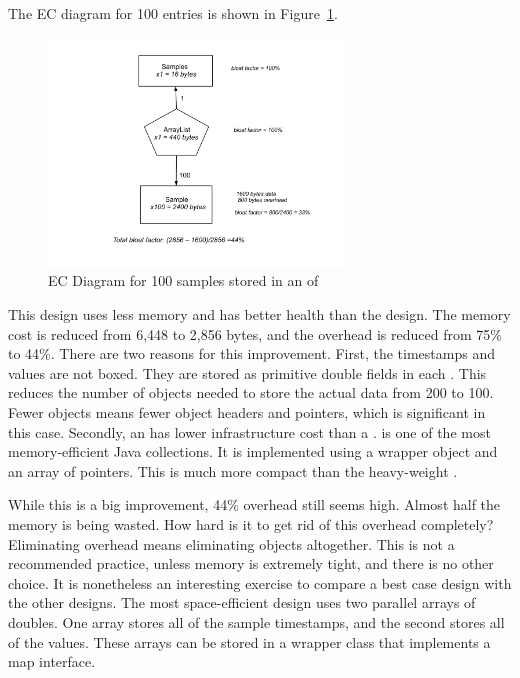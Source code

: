 The EC diagram for 100 entries is shown in Figure~\ref{fig:content-schematic-arraylist-pairs}.
\begin{figure}
  \centering
 \includegraphics[width=0.7\textwidth]{part1/Figures/memoryhealth/arraylist-doubles}
  \caption{EC Diagram for 100 samples stored in an  of }
  \label{fig:content-schematic-arraylist-pairs}
\end{figure} 
This design uses less memory and has better health than the 
design. The memory cost is reduced from 6,448 to 2,856 bytes, and the overhead
is reduced from 75\% to 44\%.  There are two reasons for this improvement.
First, the timestamps and values are not boxed. They are stored as primitive
double fields in each . This reduces the number of objects needed
to store the actual data from 200 to 100. Fewer objects means fewer object
headers and pointers, which is significant in this case. Secondly, an
 has lower infrastructure cost than a .
 is one of the most memory-efficient Java collections. It is
implemented using a wrapper object and an array of pointers. This is much more
compact than the heavy-weight .

While this is a big improvement, 44\% overhead still seems high. Almost half the
memory is being wasted. How hard is it to get rid of this overhead completely?
Eliminating overhead means eliminating objects altogether. This is not a
recommended practice, unless memory is extremely tight, and there is no other
choice. It is nonetheless an interesting exercise to compare a best case
design with the other designs. The most space-efficient design uses two parallel
arrays of doubles. One array stores all of the sample timestamps, and the second
stores all of the values. These arrays can be stored in a wrapper class that
implements a map interface.

